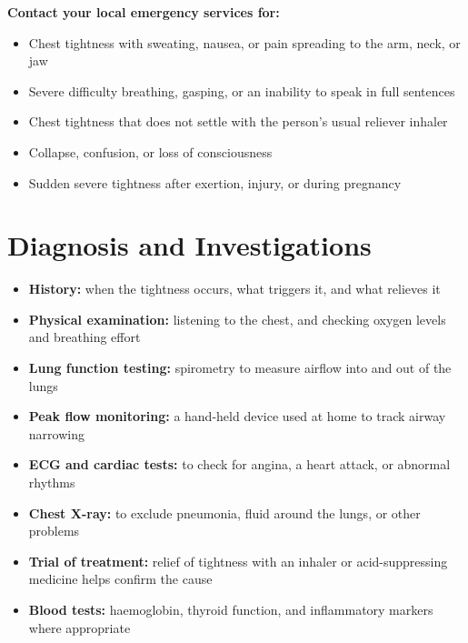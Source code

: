 \medskip
\textbf{Contact your local emergency services for:}
\begin{itemize}
    \item Chest tightness with sweating, nausea, or pain spreading to the arm, neck, or jaw
    \item Severe difficulty breathing, gasping, or an inability to speak in full sentences
    \item Chest tightness that does not settle with the person's usual reliever inhaler
    \item Collapse, confusion, or loss of consciousness
    \item Sudden severe tightness after exertion, injury, or during pregnancy
\end{itemize}

\section*{Diagnosis and Investigations}
\begin{itemize}
    \item \textbf{History:} when the tightness occurs, what triggers it, and what relieves it
    \item \textbf{Physical examination:} listening to the chest, and checking oxygen levels and breathing effort
    \item \textbf{Lung function testing:} spirometry to measure airflow into and out of the lungs
    \item \textbf{Peak flow monitoring:} a hand-held device used at home to track airway narrowing
    \item \textbf{ECG and cardiac tests:} to check for angina, a heart attack, or abnormal rhythms
    \item \textbf{Chest X-ray:} to exclude pneumonia, fluid around the lungs, or other problems
    \item \textbf{Trial of treatment:} relief of tightness with an inhaler or acid-suppressing medicine helps confirm the cause
    \item \textbf{Blood tests:} haemoglobin, thyroid function, and inflammatory markers where appropriate
\end{itemize}

